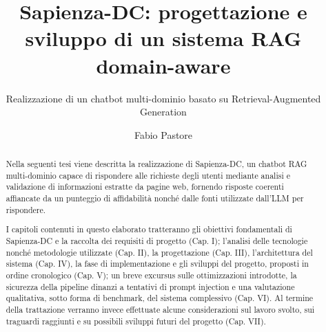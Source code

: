\documentclass[binding=0.6cm, noexaminfo]{sapthesis}
\title{Sapienza-DC: progettazione e sviluppo di un sistema RAG domain-aware}
\subtitle{Realizzazione di un chatbot multi-dominio basato su Retrieval-Augmented Generation}
\author{Fabio Pastore}
\begin{document}
\frontmatter
\maketitle

\dedication{Sapere aude.}

\begin{abstract}
Nella seguenti tesi viene descritta la realizzazione di Sapienza-DC,
un chatbot RAG multi-dominio capace di rispondere alle richieste degli
utenti mediante analisi e validazione di informazioni estratte da pagine web, fornendo risposte coerenti affiancate da un punteggio di affidabilità nonché dalle fonti utilizzate dall'LLM per rispondere.

I capitoli contenuti in questo elaborato tratteranno gli obiettivi fondamentali di Sapienza-DC e la raccolta dei requisiti di progetto (Cap. I); l'analisi delle tecnologie nonché metodologie utilizzate (Cap. II), la progettazione (Cap. III), l'architettura del sistema (Cap. IV), la fase di implementazione e gli sviluppi del progetto, proposti in ordine cronologico (Cap. V); un breve excursus sulle ottimizzazioni introdotte, la sicurezza della pipeline dinanzi a tentativi di prompt injection e una valutazione qualitativa, sotto forma di benchmark, del sistema complessivo (Cap. VI). Al termine della trattazione verranno invece effettuate alcune considerazioni sul lavoro svolto, sui traguardi raggiunti e su possibili sviluppi futuri del progetto (Cap. VII).
\end{abstract}

\tableofcontents

\mainmatter








\backmatter

\cleardoublepage
{} %


\end{document}
